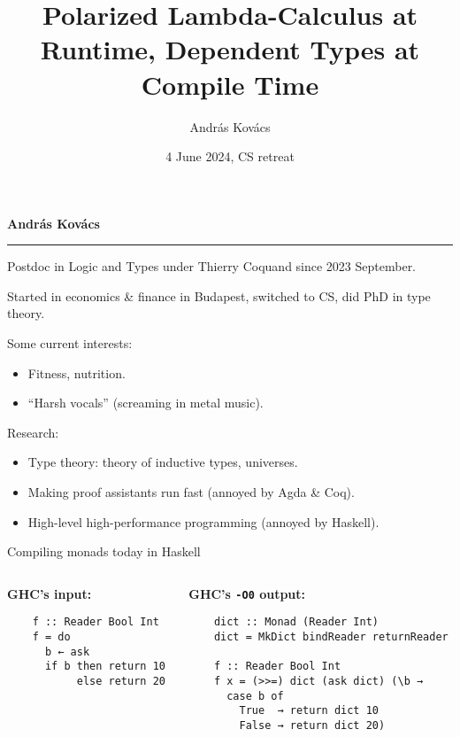 \documentclass[dvipsnames,aspectratio=169]{beamer}
\title{Polarized Lambda-Calculus at Runtime, Dependent Types at Compile Time}
\author{András Kovács}
\date{4 June 2024, CS retreat}
\theoremstyle{remark}
\begin{document}
\frame{\titlepage}

\begin{frame}

\large{\textbf{András Kovács}}
\vspace{0.3em}
\hrule
\vspace{1em}

Postdoc in Logic and Types under Thierry Coquand since 2023 September.
\vspace{1em}

Started in economics \& finance in Budapest, switched to CS,
did PhD in type theory.
\vspace{1em}

Some current interests:
\begin{itemize}
\item Fitness, nutrition.
\item ``Harsh vocals'' (screaming in metal music).
\end{itemize}
\vspace{1em}

Research:
\begin{itemize}
  \item Type theory: theory of inductive types, universes.
  \item Making proof assistants run fast (annoyed by Agda \& Coq).
  \item High-level high-performance programming (annoyed by Haskell).
\end{itemize}


\end{frame}

\begin{frame}[fragile]{Compiling monads today in Haskell}

\begin{columns}
\begin{column}{0.3\textwidth}
\textbf{GHC's input:}
\begin{verbatim}
    f :: Reader Bool Int
    f = do
      b ← ask
      if b then return 10
           else return 20



\end{verbatim}
\end{column}
\begin{column}{0.5\textwidth}
\textbf{GHC's \texttt{-O0} output:}
\begin{verbatim}
    dict :: Monad (Reader Int)
    dict = MkDict bindReader returnReader

    f :: Reader Bool Int
    f x = (>>=) dict (ask dict) (\b →
      case b of
        True  → return dict 10
        False → return dict 20)
\end{verbatim}
\end{column}
\end{columns}

\end{frame}
\end{document}
